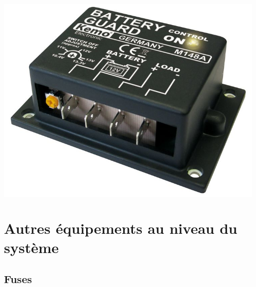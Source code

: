 \documentclass{article}
\theoremstyle{definition}
\theoremstyle{definition}
\theoremstyle{remark}
\begin{document}
  \begin{center}
    \includegraphics[width=0.15\paperwidth]{../Images/image_7_1_(discharge_control).png}
  \end{center}


{\color{blue}\section{Autres équipements au niveau du système}} %
\label{sec:autres_equipements_au_niveau_du_systeme}

  {\color{blue}\subsection{Fuses}} %
  \label{sub:fuses}
\end{document}
